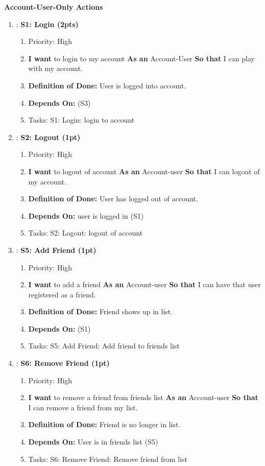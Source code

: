 \textbf{Account-User-Only Actions}
\begin{enumerate}
    \item: \textbf{S1: Login (2pts)}
    \begin{enumerate}
        \item Priority: High 
        \item \textbf{I want} to login to my account \textbf{As an} Account-User \textbf{So that} I can play with my account.
        \item \textbf{Definition of Done:} User is logged into account.
        \item \textbf{Depends On:} (S3)
        \item Tasks: S1: Login: login to account
    \end{enumerate}

    \item: \textbf{S2: Logout (1pt)}
    \begin{enumerate}
        \item Priority: High 
        \item \textbf{I want} to logout of account \textbf{As an} Account-user \textbf{So that} I can logout of my account.
        \item \textbf{Definition of Done:} User has logged out of account.
        \item \textbf{Depends On:} user is logged in (S1)
        \item Tasks: S2: Logout: logout of account
    \end{enumerate}

    \item: \textbf{S5: Add Friend (1pt)}
    \begin{enumerate}
        \item Priority: High 
        \item \textbf{I want} to add a friend \textbf{As an} Account-user \textbf{So that} I can have that user registered as a friend.
        \item \textbf{Definition of Done:} Friend shows up in list.
        \item \textbf{Depends On:} (S1)
        \item Tasks: S5: Add Friend: Add friend to friends list
    \end{enumerate}

    \item: \textbf{S6: Remove Friend (1pt)}
    \begin{enumerate}
        \item Priority: High 
        \item \textbf{I want} to remove a friend from friends list \textbf{As an} Account-user \textbf{So that} I can remove a friend from my list.
        \item \textbf{Definition of Done:} Friend is no longer in list.
        \item \textbf{Depends On:} User is in friends list (S5)
        \item Tasks: S6: Remove Friend: Remove friend from list
    \end{enumerate}


\end{enumerate}
